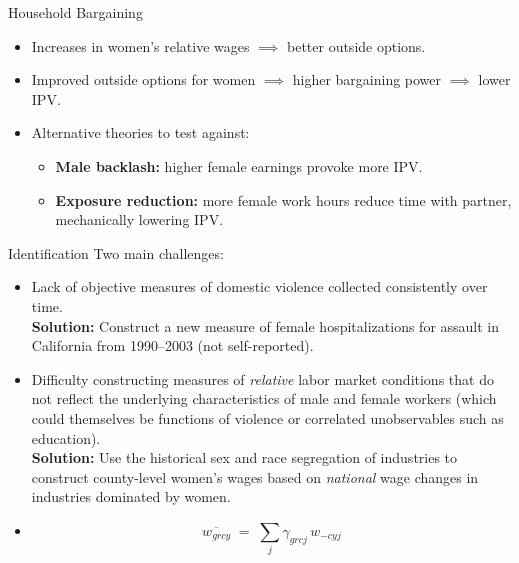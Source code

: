 \documentclass[11pt,notes=hide,aspectratio=169,mathserif]{beamer}
\begin{document}
\begin{frame}{Household Bargaining}
\begin{itemize}
  \item Increases in women's relative wages $\implies$ better outside options.
  \item Improved outside options for women $\implies$ higher bargaining power $\implies$ lower IPV.
  \item Alternative theories to test against:
  \begin{itemize}
    \item \textbf{Male backlash:} higher female earnings provoke more IPV.
    \item \textbf{Exposure reduction:} more female work hours reduce time with partner, mechanically lowering IPV.
  \end{itemize}
\end{itemize}
\end{frame}


\begin{frame}{Identification}
Two main challenges:
\begin{itemize}
\item Lack of objective measures of domestic violence collected consistently over time.\\
\pause \textbf{Solution:} Construct a new measure of female hospitalizations for assault in California from 1990--2003 (not self-reported).
\item Difficulty constructing measures of \emph{relative} labor market conditions that do not reflect the underlying characteristics of male and female workers (which could themselves be functions of violence or correlated unobservables such as education).\\
\textbf{Solution:} Use the historical sex and race segregation of industries to construct county-level women’s wages based on \emph{national} wage changes in industries dominated by women.
\item \[
\overline{w_{grcy}} \;=\; \sum_{j} \gamma_{grcj}\, w_{-cyj}
\]
\end{itemize}
\end{frame}
\end{document}
